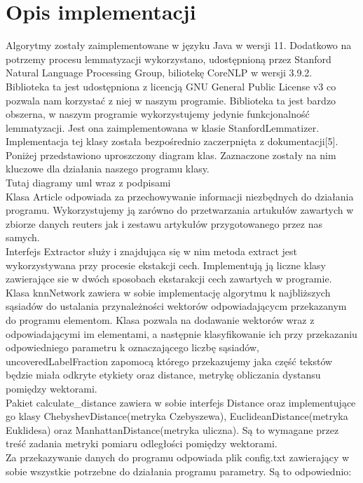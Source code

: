 \documentclass{classrep}
\begin{document}
\section{Opis implementacji}
Algorytmy zostały zaimplementowane w języku Java w wersji 11. Dodatkowo na potrzemy procesu lemmatyzacji wykorzystano, udostępnioną przez Stanford Natural Language Processing Group, biliotekę CoreNLP w wersji 3.9.2. Biblioteka ta jest udostępniona z licencją GNU General Public License v3 co pozwala nam korzystać z niej w naszym programie. Biblioteka ta jest bardzo obszerna, w naszym programie wykorzystujemy jedynie funkcjonalność lemmatyzacji. Jest ona zaimplementowana w klasie StanfordLemmatizer. Implementacja tej klasy została bezpośrednio zaczerpnięta z dokumentacji[5]. Poniżej przedstawiono uproszczony diagram klas. Zaznaczone zostały na nim kluczowe dla działania naszego programu klasy.\\
{\color{red}
Tutaj diagramy uml wraz z podpisami\\}
Klasa Article odpowiada za przechowywanie informacji niezbędnych do działania programu. Wykorzystujemy ją zarówno do przetwarzania artukułów zawartych w zbiorze danych reuters jak i zestawu artykułów przygotowanego przez nas samych.\\
Interfejs Extractor służy i znajdująca się w nim metoda extract jest wykorzystywana przy procesie ekstakcji cech. Implementują ją liczne klasy zawierające sie w dwóch sposobach ekstarakcji cech zawartych w programie.\\
Klasa knnNetwork zawiera w sobie implementację algorytmu k najbliższych sąsiadów do ustalania przynależności wektorów odpowiadającycm przekazanym do programu elementom. Klasa pozwala na dodawanie wektorów wraz z odpowiadającymi im elementami, a następnie klasyfikowanie ich przy przekazaniu odpowiedniego parametru k oznaczającego liczbę sąsiadów, uncoveredLabelFraction zapomocą którego przekazujemy jaka część tekstów będzie miała odkryte etykiety oraz distance, metrykę obliczania dystansu pomiędzy wektorami.\\
Pakiet calculate_distance zawiera w sobie interfejs Distance oraz implementujące go klasy ChebyshevDistance(metryka Czebyszewa), EuclideanDistance(metryka Euklidesa) oraz ManhattanDistance(metryka uliczna). Są to wymagane przez treść zadania metryki pomiaru odległości pomiędzy wektorami.\\
Za przekazywanie danych do programu odpowiada plik config.txt zawierający w sobie wszystkie potrzebne do działania programu parametry. Są to odpowiednio:
\end{document}
